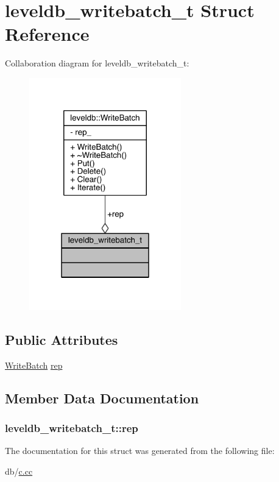 \hypertarget{structleveldb__writebatch__t}{}\section{leveldb\+\_\+writebatch\+\_\+t Struct Reference}
\label{structleveldb__writebatch__t}


Collaboration diagram for leveldb\+\_\+writebatch\+\_\+t\+:\nopagebreak
\begin{figure}[H]
\begin{center}
\leavevmode
\includegraphics[width=187pt]{structleveldb__writebatch__t__coll__graph}
\end{center}
\end{figure}
\subsection*{Public Attributes}
\begin{DoxyCompactItemize}
\item 
\hyperlink{classleveldb_1_1_write_batch}{Write\+Batch} \hyperlink{structleveldb__writebatch__t_ac96538c849db578bea786bf29fae6e5f}{rep}
\end{DoxyCompactItemize}


\subsection{Member Data Documentation}
\hypertarget{structleveldb__writebatch__t_ac96538c849db578bea786bf29fae6e5f}{}
\subsubsection[{rep}]{ leveldb\+\_\+writebatch\+\_\+t\+::rep}\label{structleveldb__writebatch__t_ac96538c849db578bea786bf29fae6e5f}


The documentation for this struct was generated from the following file\+:\begin{DoxyCompactItemize}
\item 
db/\hyperlink{c_8cc}{c.\+cc}\end{DoxyCompactItemize}
